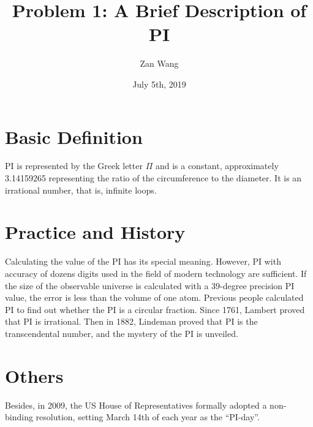 \documentclass{article}
\title{Problem 1: A Brief Description of PI}
\author{Zan Wang}
\date{July 5th, 2019}
\begin{document}
\maketitle

\section{Basic Definition}
PI is represented by the Greek letter $\Pi$ and is a constant, approximately 3.14159265 representing the ratio of the circumference to the diameter. It is an irrational number, that is, infinite loops.
\section{Practice and History}
Calculating the value of the PI has its special meaning. However, PI with accuracy of dozens digits used in the field of modern technology are sufficient. If the size of the observable universe is calculated with a 39-degree precision PI value, the error is less than the volume of one atom. Previous people calculated PI to find out whether the PI is a circular fraction. Since 1761, Lambert proved that PI is irrational. Then in 1882, Lindeman proved that PI is the transcendental number, and the mystery of the PI is unveiled.
\section{Others}
Besides, in 2009, the US House of Representatives formally adopted a non-binding resolution, setting March 14th of each year as the “PI-day”.
\end{document}
